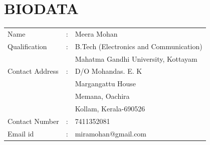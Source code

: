\documentclass[a4paper,12pt]{report}
\begin{document}
\newpage
 


\newpage
 

\newpage



%
%
%
\newpage
\pagestyle{plain}
\section*{\centering BIODATA}
\begin{tabular}{lll}
Name			&:	&Meera Mohan			\\

Qualification 		&:	&B.Tech (Electronics and Communication)	\\

			&	&Mahatma Gandhi University, Kottayam			\\

Contact Address 	&:	&D/O Mohandas. E. K			\\
		
			&	&Margangattu House		\\
		
			&	&Memana, Oachira		\\

			&	&Kollam, Kerala-690526		\\

Contact Number  	&:	&7411352081				\\

Email id		&:	&miramohan@gmail.com			\\

\end{tabular}



\end{document}
